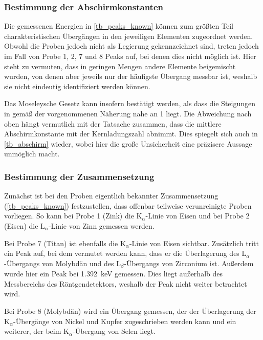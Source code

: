 \documentclass[
	a4paper,
	12pt,
	pagesize,
	ngerman
]{scrartcl}
\begin{document}
	\subsubsection{Bestimmung der Abschirmkonstanten}
	Die gemessenen Energien in \cref{tb_peaks_known} können zum größten Teil charakteristischen Übergängen in den jeweiligen Elementen zugeordnet werden.
	Obwohl die Proben jedoch nicht als Legierung gekennzeichnet sind, treten jedoch im Fall von Probe 1, 2, 7 und 8 Peaks auf, bei denen dies nicht möglich ist.
	Hier steht zu vermuten, dass in geringen Mengen andere Elemente beigemischt wurden, von denen aber jeweils nur der häufigste Übergang messbar ist, weshalb sie nicht eindeutig identifiziert werden können.

	Das Moseleysche Gesetz kann insofern bestätigt werden, als dass die Steigungen in  gemäß der vorgenommenen Näherung nahe an \num{1} liegt.
	Die Abweichung nach oben hängt vermutlich mit der Tatsache zusammen, dass die mittlere Abschirmkonstante mit der Kernladungszahl abnimmt.
	Dies spiegelt sich auch in \cref{tb_abschirm} wieder, wobei hier die große Unsicherheit eine präzisere Aussage unmöglich macht.

	\subsubsection{Bestimmung der Zusammensetzung}
	Zunächst ist bei den Proben eigentlich bekannter Zusammensetzung (\cref{tb_peaks_known}) festzustellen, dass offenbar teilweise verunreinigte Proben vorliegen.
	So kann bei Probe 1 (Zink) die $\text{K}_\alpha$-Linie von Eisen und bei Probe 2 (Eisen) die $\text{L}_\alpha$-Linie von Zinn gemessen werden.

	Bei Probe 7 (Titan) ist ebenfalls die  $\text{K}_\alpha$-Linie von Eisen sichtbar.
	Zusätzlich tritt ein Peak auf, bei dem vermutet werden kann, dass er die Überlagerung des $\text{L}_\alpha$-Übergangs von Molybdän und des $\text{L}_\beta$-Übergangs von Zirconium ist.
	Außerdem wurde hier ein Peak bei \SI{1,392}{keV} gemessen.
	Dies liegt außerhalb des Messbereichs des Röntgendetektors, weshalb der Peak nicht weiter betrachtet wird.

	Bei Probe 8 (Molybdän) wird ein Übergang gemessen, der der Überlagerung der $\text{K}_\alpha$-Übergänge von Nickel und Kupfer zugeschrieben werden kann und ein weiterer, der beim $\text{K}_\alpha$-Übergang von Selen liegt.
\end{document}
